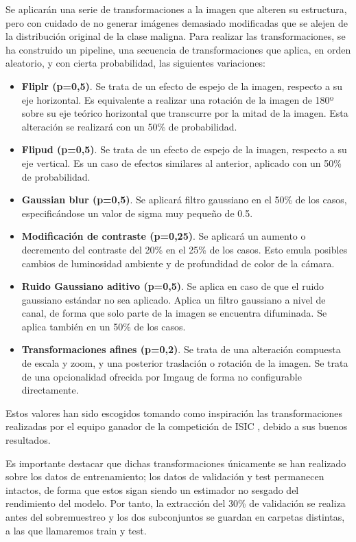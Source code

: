 Se aplicarán una serie de transformaciones a la imagen que alteren su estructura, pero con cuidado de no generar imágenes demasiado modificadas que se alejen de la distribución original de la clase maligna. Para realizar las transformaciones, se ha construido un pipeline, una secuencia de transformaciones que aplica, en orden aleatorio, y con cierta probabilidad, las siguientes variaciones:

\begin{itemize}
	\item \textbf{Fliplr (p=0,5)}. Se trata de un efecto de espejo de la imagen, respecto a su eje horizontal. Es equivalente a realizar una rotación de la imagen de 180º sobre su eje teórico horizontal que transcurre por la mitad de la imagen. Esta alteración se realizará con un 50\% de probabilidad.
	\item \textbf{Flipud (p=0,5)}. Se trata de un efecto de espejo de la imagen, respecto a su eje vertical. Es un caso de efectos similares al anterior, aplicado con un 50\% de probabilidad.
	\item \textbf{Gaussian blur (p=0,5)}. Se aplicará filtro gaussiano en el 50\% de los casos, especificándose un valor de sigma muy pequeño de 0.5.
	\item \textbf{Modificación de contraste  (p=0,25)}. Se aplicará un aumento o decremento del contraste del 20\% en el 25\% de los casos. Esto emula posibles cambios de luminosidad ambiente y de profundidad de color de la cámara.
	\item \textbf{Ruido Gaussiano aditivo  (p=0,5)}. Se aplica en caso de que el ruido gaussiano estándar no sea aplicado. Aplica un filtro gaussiano a nivel de canal, de forma que solo parte de la imagen se encuentra difuminada.  Se aplica también en un 50\% de los casos.
	\item \textbf{Transformaciones afines  (p=0,2)}. Se trata de una alteración compuesta de escala y zoom, y una posterior traslación o rotación de la imagen. Se trata de una opcionalidad ofrecida por Imgaug de forma no configurable directamente.
\end{itemize}

Estos valores han sido escogidos tomando como inspiración las transformaciones realizadas por el equipo ganador de la competición de ISIC \cite{1stISIC}, debido a sus buenos resultados.

Es importante destacar que dichas transformaciones únicamente se han realizado sobre los datos de entrenamiento; los datos de validación y test permanecen intactos, de forma que estos sigan siendo un estimador no sesgado del rendimiento del modelo. Por tanto, la extracción del 30\% de validación se realiza antes del sobremuestreo y los dos subconjuntos se guardan en carpetas distintas, a las que llamaremos train y test.

